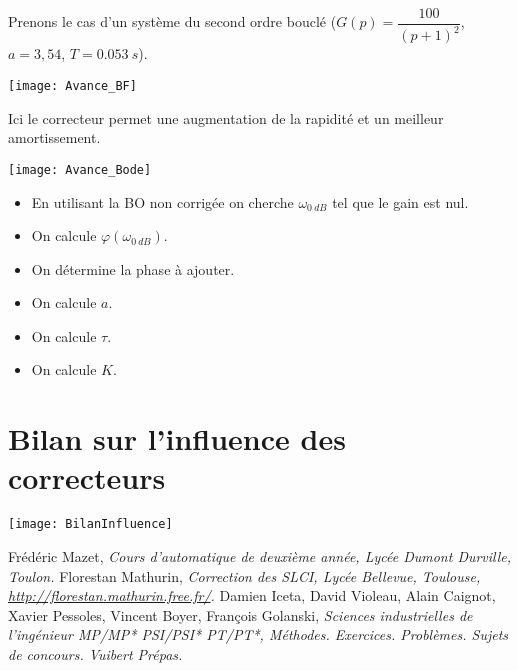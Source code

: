 \noindent
\begin{minipage}[c]{.46\linewidth}
Prenons le cas d'un système du second ordre bouclé ($G(p)=\dfrac{100}{\left(p+1\right)^2}$, $a=3,54$, $T=\SI{0,053}{s}$).

\begin{center}
\texttt{[image: Avance\_BF]}

\end{center}
Ici le correcteur permet une augmentation de la rapidité et un meilleur amortissement.
\end{minipage} \hfill
\begin{minipage}[c]{.46\linewidth}
\begin{center}
\texttt{[image: Avance\_Bode]}

\end{center}
\end{minipage} 



\begin{methode}
\begin{itemize}
\item En utilisant la BO non corrigée on cherche $\omega_{\SI{0}{dB}}$ tel que le gain est nul.
\item On calcule $\varphi\left(\omega_{\SI{0}{dB}}\right)$. 
\item On détermine la phase à ajouter. 
\item On calcule $a$. 
\item On calcule $\tau$.
\item On calcule $K$. 
\end{itemize}


\end{methode}


\section{Bilan sur l'influence des correcteurs}
\begin{center}
\texttt{[image: BilanInfluence]}
\end{center}

\begin{thebibliography}{2}
    Frédéric Mazet, {\it Cours d'automatique de deuxième année, Lycée Dumont Durville, Toulon.}
       Florestan Mathurin, {\it Correction des SLCI, Lycée Bellevue, Toulouse, \url{http://florestan.mathurin.free.fr/}.}
       Damien Iceta, David Violeau, Alain Caignot, Xavier Pessoles, Vincent Boyer, François Golanski, {\it Sciences industrielles de l'ingénieur MP/MP* PSI/PSI* PT/PT*, Méthodes. Exercices. Problèmes. Sujets de concours. Vuibert Prépas.}
\end{thebibliography}

%



